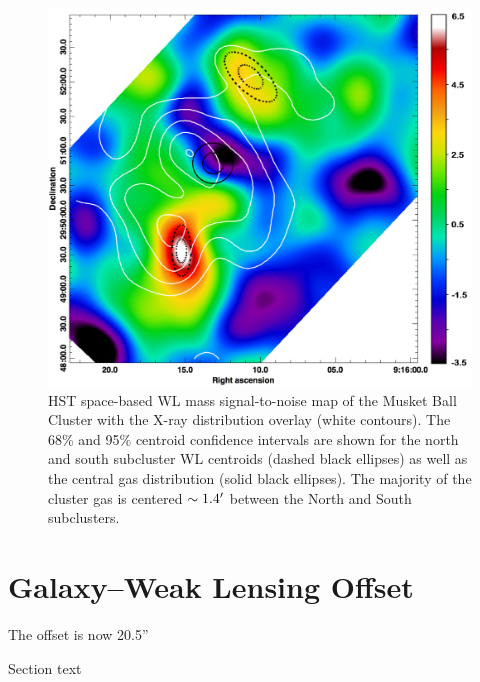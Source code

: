 \begin{figure}
\centering
\includegraphics[width=5in]{Chapter4/LensingXrayOverlay.png}
\caption[Musket Ball Cluster weak lensing signal-to-noise map with X-ray map overlay, including centroid locations.]{
HST space-based WL mass signal-to-noise map of the Musket Ball Cluster with the X-ray distribution overlay (white contours).
The 68\% and 95\% centroid confidence intervals are shown for the north and south subcluster WL centroids (dashed black ellipses) as well as the central gas distribution (solid black ellipses).
The majority of the cluster gas is centered $\sim1.4\mbox{$^\prime$}$ between the North and South subclusters.
}
\label{figure:LensingXrayOverlay}
\end{figure}


\section{Galaxy--Weak Lensing Offset}\label{section:GalaxyWLOffset}

The offset is now 20.5''

Section text

